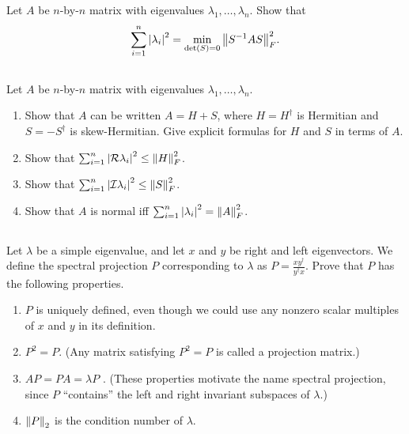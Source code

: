 \documentclass[a4paper]{ctexart}
\newcommand{\pf}{\textbf{\color{pink}{proof:}}}
\begin{document}
\pf

\subsection{}
Let $A$ be $n$-by-$n$ matrix with eigenvalues $\lambda_1, \ldots , \lambda_n$.
Show that
\begin{equation*}
    \sum_{i=1}^n\abs{\lambda_i}^2 = \min_{\det(S) =0}\norm{S^{-1}AS}^2_F.
\end{equation*}

\pf

\subsection{}
Let $A$ be $n$-by-$n$ matrix with eigenvalues $\lambda_1, \ldots , \lambda_n$.
\begin{enumerate}
    \item Show that $A$ can be written $A = H + S$, where $H = H^\dag$ is Hermitian
    and $S = -S^\dag$ is skew-Hermitian. Give explicit formulas for $H$ and $S$ in
    terms of $A$.
    \item Show that $\sum_{i=1}^n\abs{\mathcal{R}\lambda_i}^2\le \norm{H}_F^2$.
    \item Show that $\sum_{i=1}^n\abs{\mathcal{I}\lambda_i}^2\le \norm{S}_F^2$.
    \item Show that $A$ is normal iff $\sum_{i=1}^n\abs{\lambda_i}^2 = \norm{A}_F^2$.
\end{enumerate}

\pf

\subsection{}
Let $\lambda$ be a simple eigenvalue, and let $x$ and $y$ be right
and left eigenvectors. We define the spectral projection $P$ corresponding to $\lambda$
as $P = \frac{xy^\dag}{y^\dag x}$. Prove that $P$ has the following properties.
\begin{enumerate}
    \item $P$ is uniquely deﬁned, even though we could use any nonzero scalar multiples
     of $x$ and $y$ in its deﬁnition.
    \item $P^2 = P$. (Any matrix satisfying $P^2 = P$ is called a projection matrix.)
    \item $AP = P A = \lambda P$ . (These properties motivate the name spectral projection,
     since $P$ “contains” the left and right invariant subspaces of $\lambda$.)
    \item $\norm{P}_2$ is the condition number of $\lambda$.
\end{enumerate}
\end{document}
